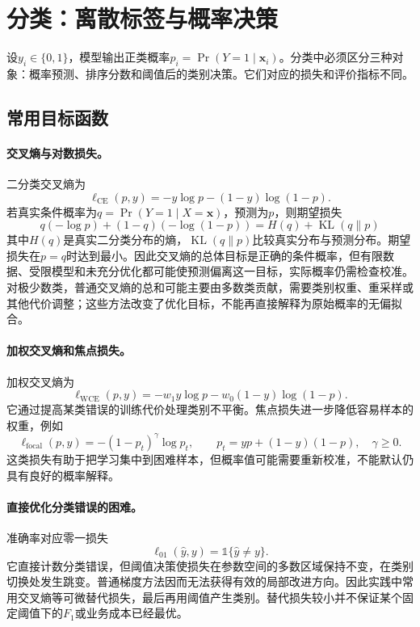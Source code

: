 \section{分类：离散标签与概率决策}
设$y_i\in\{0,1\}$，模型输出正类概率$p_i=\Pr(Y=1\mid\bm x_i)$。分类中必须区分三种对象：概率预测、排序分数和阈值后的类别决策。它们对应的损失和评价指标不同。

\subsection{常用目标函数}
\paragraph{交叉熵与对数损失。}
二分类交叉熵为
\begin{equation}
 \ell_{\mathrm{CE}}(p,y)=-y\log p-(1-y)\log(1-p).
 \label{eq:classification-cross-entropy}
\end{equation}
若真实条件概率为$q=\Pr(Y=1\mid X=\bm x)$，预测为$p$，则期望损失
\begin{equation}
 q(-\log p)+(1-q)(-\log(1-p))
 =H(q)+\operatorname{KL}(q\|p)
 \label{eq:classification-cross-entropy-kl}
\end{equation}
其中$H(q)$是真实二分类分布的熵，$\operatorname{KL}(q\|p)$比较真实分布与预测分布。期望损失在$p=q$时达到最小。因此交叉熵的总体目标是正确的条件概率，但有限数据、受限模型和未充分优化都可能使预测偏离这一目标，实际概率仍需检查校准。对极少数类，普通交叉熵的总和可能主要由多数类贡献，需要类别权重、重采样或其他代价调整；这些方法改变了优化目标，不能再直接解释为原始概率的无偏拟合。

\paragraph{加权交叉熵和焦点损失。}
加权交叉熵为
\begin{equation}
 \ell_{\mathrm{WCE}}(p,y)=-w_1y\log p-w_0(1-y)\log(1-p).
 \label{eq:classification-weighted-ce}
\end{equation}
它通过提高某类错误的训练代价处理类别不平衡。焦点损失进一步降低容易样本的权重，例如
\begin{equation}
 \ell_{\mathrm{focal}}(p,y)=-(1-p_t)^\gamma\log p_t,
 \qquad p_t=yp+(1-y)(1-p),\quad\gamma\geq0.
 \label{eq:classification-focal}
\end{equation}
这类损失有助于把学习集中到困难样本，但概率值可能需要重新校准，不能默认仍具有良好的概率解释。

\paragraph{直接优化分类错误的困难。}
准确率对应零一损失
\begin{equation}
 \ell_{01}(\hat y,y)=\mathbb{1}\{\hat y\neq y\}.
 \end{equation}
它直接计数分类错误，但阈值决策使损失在参数空间的多数区域保持不变，在类别切换处发生跳变。普通梯度方法因而无法获得有效的局部改进方向。因此实践中常用交叉熵等可微替代损失，最后再用阈值产生类别。替代损失较小并不保证某个固定阈值下的$F_1$或业务成本已经最优。

